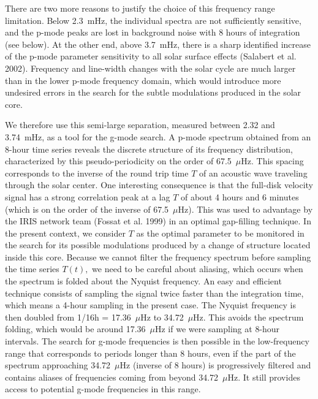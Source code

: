 \documentclass[bibyear]{aa}
\begin{document}
There are two more reasons to justify the choice of this frequency range limitation. Below 2.3~mHz, the individual spectra are not sufficiently sensitive, and the p-mode peaks are lost in background noise with 8 hours of integration (see below). At the other end, above 3.7~mHz, there is a sharp identified increase of the p-mode parameter sensitivity to all solar surface effects (Salabert et al. 2002).  Frequency and line-width changes with the solar cycle are much larger than in the lower p-mode frequency domain, which  would introduce more undesired errors in the search for the subtle modulations produced in the solar core.  







We therefore use this semi-large separation, measured between 2.32 and 3.74~mHz,  as a tool for the g-mode search. A p-mode spectrum obtained from an 8-hour time series reveals the discrete structure of its frequency distribution, characterized by this pseudo-periodicity on the order of 67.5~$\mu$Hz. This spacing corresponds to the inverse of the round trip time $T$ of an acoustic wave traveling through the solar center. One interesting consequence is that the full-disk velocity signal has a strong correlation peak at a lag $T$ of about 4 hours and 6 minutes (which is on the order of the inverse of 67.5~$\mu$Hz). This was used to advantage by the IRIS network team (Fossat et al. 1999) in an optimal gap-filling technique. In the present context, we consider $T$ as the optimal parameter to be monitored in the search for its possible modulations produced by a change of structure located inside this core. Because we cannot filter the frequency spectrum before sampling the time series $T(t),$ we need to be careful about aliasing, which occurs when the spectrum is folded about the Nyquist frequency. An easy and efficient technique consists of sampling the signal twice faster than the integration time, which means a 4-hour sampling in the present case. The Nyquist frequency is then doubled from 1/16h = 17.36~$\mu$Hz to  34.72~$\mu$Hz. This avoids the spectrum folding, which would be around 17.36~$\mu$Hz if we were sampling at 8-hour intervals. The search for g-mode frequencies is then possible in the low-frequency range that corresponds  to periods longer than 8 hours, even if the part of the spectrum approaching 34.72~$\mu$Hz (inverse of 8 hours) is progressively filtered and contains aliases of frequencies coming from beyond 34.72~$\mu$Hz. It still provides access to potential g-mode frequencies in this range.
\end{document}
